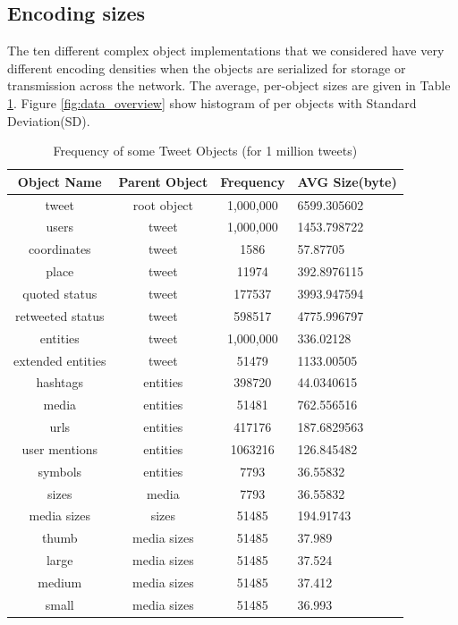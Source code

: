 \subsection{Encoding sizes}
The ten different complex object implementations that we considered have very different encoding densities when the objects are serialized for storage or transmission across the network. The average, per-object sizes are given in Table \ref{tbl:object_size}. Figure \ref{fig:data_overview} show histogram of per objects with Standard Deviation(SD).
\begin{table}
	\centering
	\caption{Frequency of some Tweet Objects  (for 1 million tweets) }
	\label{tbl:object_size}
	\begin{adjustbox}{width=\columnwidth,center}	
		
		\begin{tabular}{|c|c|c|l|} \hline
			Object Name &Parent Object &Frequency&AVG Size(byte)\\ \hline
			tweet  & root object& 1,000,000 & 6599.305602\\ \hline
			users & tweet & 1,000,000 & 1453.798722\\ \hline
			coordinates  &tweet& 1586 & 57.87705\\ \hline
			place & tweet & 11974 & 392.8976115\\ \hline
			quoted status  & tweet & 177537 & 3993.947594\\ \hline
			retweeted status  & tweet & 598517 & 4775.996797\\ \hline
			entities  & tweet & 1,000,000 &336.02128\\ \hline
			extended entities  & tweet & 51479 & 1133.00505\\ \hline
			hashtags  & entities & 398720 & 44.0340615\\ \hline
			media  & entities & 51481 & 762.556516\\ \hline
			urls  & entities & 417176 & 187.6829563\\ \hline
			user mentions  & entities & 1063216 & 126.845482\\ \hline
			symbols  & entities & 7793 & 36.55832\\ \hline
			sizes  & media & 7793 & 36.55832\\ \hline
			media sizes  & sizes & 51485 & 194.91743\\ \hline
			thumb  & media sizes & 51485 & 37.989\\ \hline
			large  & media sizes & 51485 & 37.524\\ \hline
			medium  & media sizes & 51485 & 37.412\\ \hline
			small  & media sizes & 51485 & 36.993\\ \hline
			\hline\end{tabular}
	\end{adjustbox}
\end{table}

